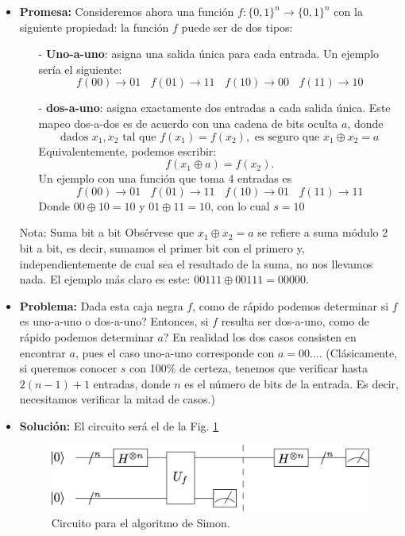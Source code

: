 \documentclass[a4paper,11pt]{book} %
\numberwithin{equation}{chapter}
\begin{document}
\begin{itemize}
	\item \textbf{Promesa:} Consideremos ahora una función $f:\{0,1\}^n \to \{0,1\}^n$ con la siguiente propiedad: la función $f$ puede ser de dos tipos:
	\begin{itemize}
		\item[-] \textbf{Uno-a-uno}: asigna una salida única para cada entrada. Un ejemplo sería el siguiente:
		$$
		f(00) \rightarrow 01 ~~~~
		f(01) \rightarrow 11 ~~~~
		f(10) \rightarrow 00 ~~~~
		f(11) \rightarrow 10 
		$$
		\item[-] \textbf{dos-a-uno}: asigna exactamente dos entradas a cada salida única. Este mapeo dos-a-dos es de acuerdo con una cadena de bits oculta $a$, donde
		$$
		\text{dados } x_1, x_2 \text{ tal que } f(x_1) = f(x_2), \text{ es seguro que } x_1 \oplus x_2 = a
		$$
		Equivalentemente, podemos escribir: 
		$$ 
		f(x_1 \oplus a ) = f(x_2).
		$$
		Un ejemplo con una función que toma 4 entradas es
		$$
		f(00) \rightarrow 01 ~~~~
		f(01) \rightarrow 11 ~~~~
		f(10) \rightarrow 01 ~~~~
		f(11) \rightarrow 11 
		$$
		Donde $00 \oplus 10 =  10$ y $01 \oplus 11 = 10$, con lo cual $s =10$
	\end{itemize}
	
	\begin{mybox_blue}{Nota: Suma bit a bit}
	Obsérvese que $x_1 \oplus x_2 = a$ se refiere a suma módulo 2 bit a bit, es decir, sumamos el primer bit con el primero y, independientemente de cual sea el resultado de la suma, no nos llevamos nada. El ejemplo más claro es este: $00111 \oplus 00111 = 00000$.
	\end{mybox_blue}
	
	\item \textbf{Problema:} Dada esta caja negra $f$, como de rápido podemos determinar si $f$ es uno-a-uno o dos-a-uno? Entonces, si $f$ resulta ser dos-a-uno, como de rápido podemos determinar $a$? En realidad los dos casos consisten en encontrar $a$, pues el caso uno-a-uno corresponde con $a=00\dots$. (Clásicamente, si queremos conocer $s$ con 100\% de certeza, tenemos que verificar hasta $2(n-1) +1$ entradas, donde $n$ es el número de bits de la entrada. Es decir, necesitamos verificar la mitad de casos.)
		
	\item \textbf{Solución:} El circuito será el de la Fig. \ref{Fig_algoritmos_SimonCircuit}
	
		\begin{figure}[H]
			\centering 
			\includegraphics[width=0.6\linewidth]{Figuras/Fig_algoritmos_SimonCircuit.png}
			\caption{Circuito para el algoritmo de Simon.}
			\label{Fig_algoritmos_SimonCircuit}
			\end{figure}	
	

\end{itemize}
\end{document}
